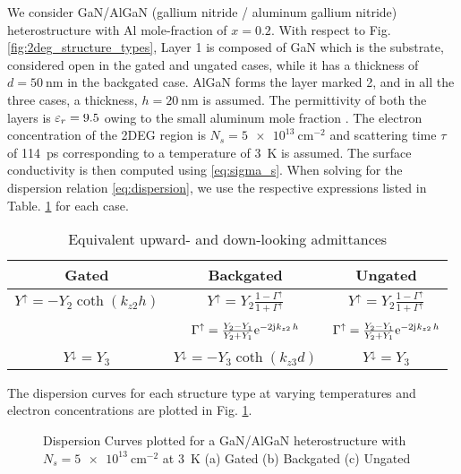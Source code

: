 We consider GaN/AlGaN (gallium nitride / aluminum gallium nitride)  heterostructure with Al mole-fraction of $x = \num[round-precision=1]{0.2}$. With respect to Fig. \ref{fig:2deg_structure_types}, Layer 1 is composed of GaN which is the substrate, considered open in the gated and ungated cases, while it has a thickness of $d = \SI{50}{\nm}$ in the backgated case. AlGaN forms the layer marked 2, and in all the three cases, a thickness, $h = \SI{20}{\nm}$ is assumed. The permittivity of both the layers is $\varepsilon_r = 9.5$ owing to the small aluminum mole fraction \cite{Muravjov2010}. The electron concentration of the 2DEG region is $N_s = \SI{5e13}{\cm^{-2}}$ and scattering time $\tau$ of \SI{114}{\ps} corresponding to a temperature of \SI{3}{\kelvin} is assumed. The surface conductivity is then computed using \eqref{eq:sigma_s}. When solving for the dispersion relation \eqref{eq:dispersion}, we use the respective expressions listed in Table. \ref{tab:equations} for each case.
%
\begin{table}[!htbp]
\begin{center}
 \begin{tabular}{|c |c |c|}
 \hline
 Gated & Backgated  & Ungated \\ [0.5ex]
 \hline\hline
 $Y^{\uparrow} = - Y_{2} \coth (k_{z2} h)$ & $Y^{\uparrow} = Y_{2} \frac{1 - \Gamma^{\uparrow}}{1 + \Gamma^{\uparrow}}$ & $Y^{\uparrow} = Y_{2} \frac{1 - \Gamma^{\uparrow}}{1 + \Gamma^{\uparrow}}$ \\  & & \\ [2ex]
\num{} & $\Gamma^{\uparrow} = \frac{Y_2 - Y_1}{Y_2 + Y_1} \mathrm{e}^{-2\mathrm{j}\mkern1mu k_{z2}\, h}$ & $\Gamma^{\uparrow} = \frac{Y_2 - Y_1}{Y_2 + Y_1} \mathrm{e}^{-2\mathrm{j}\mkern1mu k_{z2}\, h}$ \\  & &  \\ [2ex]
 $Y^{\downarrow} = Y_{3}$ & $Y^{\downarrow} = - Y_{3} \coth (k_{z3} d)$ &  $Y^{\downarrow} = Y_{3}$ \\
 \hline
 \end{tabular}
  \end{center}
 \caption{Equivalent upward- and down-looking admittances}
 \label{tab:equations}
\end{table}
%

The dispersion curves for each structure type at varying temperatures and electron concentrations are plotted in Fig. \ref{fig:dispersion_hif_lowT}.
%
\begin{figure}[!htbp]
  \centering
  \caption{Dispersion Curves plotted for a GaN/AlGaN heterostructure with $N_s = \SI{5e13}{\cm^{-2}}$ at \SI{3}{\kelvin} (a) Gated (b) Backgated (c) Ungated}
  \label{fig:dispersion_hif_lowT}
\end{figure}
%

